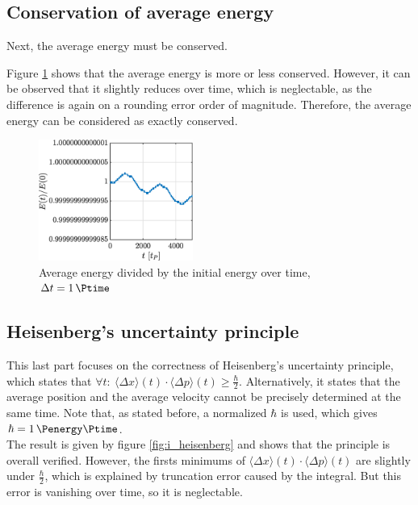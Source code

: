 \documentclass[a4paper,12pt,twoside]{article}
\begin{document}
  \subsection{Conservation of average energy}
    Next, the average energy must be conserved.

    Figure \ref{fig:i_E} shows that the average energy is more or less conserved.
    However, it can be observed that it slightly reduces over time, which is neglectable, as the difference is again on a rounding error order of magnitude.
    Therefore, the average energy can be considered as exactly conserved.

    \begin{figure}[h]
      \centering
      \includegraphics[width=0.45\textwidth]{graphs/i_E.eps}
      \caption{Average energy divided by the initial energy over time, $\Delta t = \SI{1}{\Ptime}$}
      \label{fig:i_E}
    \end{figure}

  \subsection{Heisenberg's uncertainty principle}
    This last part focuses on the correctness of Heisenberg's uncertainty principle, which states that $\forall t:~\langle \Delta x \rangle(t)\cdot\langle \Delta p \rangle(t) \geq \frac{\hbar}{2}$.
    Alternatively, it states that the average position and the average velocity cannot be precisely determined at the same time.
    Note that, as stated before, a normalized $\hbar$ is used, which gives $\hbar=\SI{1}{\Penergy\Ptime}$.\\

    The result is given by figure \ref{fig:i_heisenberg} and shows that the principle is overall verified.
    However, the firsts minimums of $\langle \Delta x \rangle(t)\cdot\langle \Delta p \rangle(t)$ are slightly under $\frac{\hbar}{2}$, which is explained by truncation error caused by the integral.
    But this error is vanishing over time, so it is neglectable.
\end{document}
